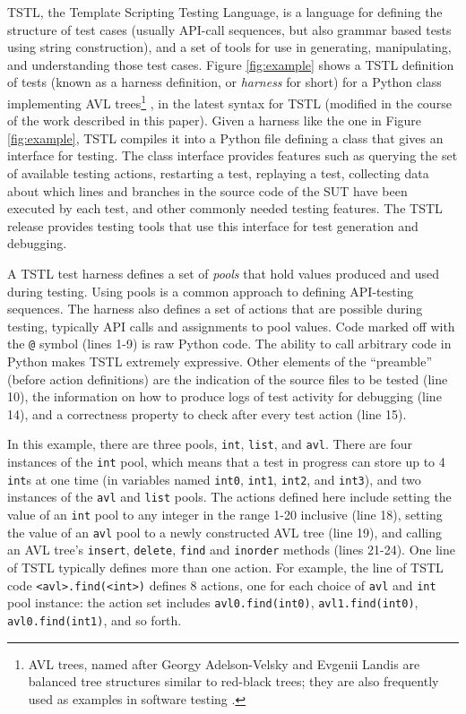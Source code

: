 TSTL, the Template Scripting Testing Language, \cite{NFM15,ISSTA15,tstl} is a language for defining the
structure of test cases (usually API-call sequences, but also
grammar based tests using string construction), and a set of tools for
use in generating, manipulating, and understanding those test cases.
Figure \ref{fig:example} shows a TSTL definition of tests (known as a
harness definition, or \emph{harness} for short) for a Python class
implementing AVL trees\footnote{AVL trees, named after Georgy
  Adelson-Velsky and Evgenii Landis \cite{AVL} are balanced tree
  structures similar to red-black trees; they are also frequently used as
  examples in software testing \cite{FASE,ISSRE}.} \cite{avltree}, in the latest syntax for TSTL (modified in the
course of the work described in this paper).  Given a harness like the
one in Figure \ref{fig:example}, TSTL compiles it into a Python file
defining a class that gives an interface for testing.  The class
interface provides features such as
querying the set of available testing actions, restarting a test,
replaying a test, collecting data about which lines and branches in
the source code of the SUT have been executed by each test, and other commonly
needed testing features.  The TSTL release \cite{tstl} provides
testing tools that use this interface for test generation and
debugging.

A TSTL test harness defines a set of \emph{pools} that hold values
produced and used during testing.   Using pools \cite{AndrewsTR} is a common
approach to defining API-testing sequences.  The harness also defines a set of
actions that are possible during testing, typically API calls and
assignments to pool values.  Code marked off with the {\tt @}
symbol (lines 1-9) is raw Python code.  The ability to call
arbitrary code in Python makes TSTL extremely expressive.  Other
elements of the ``preamble'' (before action definitions) are the
indication of the source files to be tested (line 10), the information
on how to produce logs of test activity for debugging (line 14), and a
correctness property to check after every test action (line 15).

In this example, there are three pools,
{\tt int}, {\tt list}, and {\tt avl}.  There are four instances of the
{\tt int} pool, which means that a test in progress can store up to 4
{\tt int}s at one time (in variables named {\tt int0}, {\tt int1},
{\tt int2}, and {\tt int3}), and two instances of the {\tt avl} and
{\tt list}
pools.  The actions defined here include setting the value of an {\tt int}
pool to any integer in the range 1-20 inclusive (line 18), setting the value of
an {\tt avl} pool to a newly constructed AVL tree (line 19), and calling an AVL
tree's {\tt insert}, {\tt delete}, {\tt find} and {\tt inorder}
methods (lines 21-24).  One line of TSTL typically defines more than one action. For
example, the line of TSTL code {\tt <avl>.find(<int>)} defines 8 actions, one
for each choice of {\tt avl} and {\tt int} pool instance:  the action set
includes {\tt avl0.find(int0)}, {\tt avl1.find(int0)}, {\tt
  avl0.find(int1)}, and so forth.  



